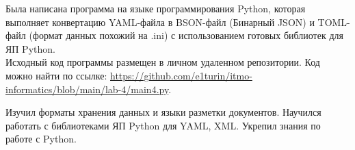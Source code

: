 \label{main4}
Была написана программа на языке программирования Python, которая выполняет конвертацию YAML-файла в BSON-файл (Бинарный JSON) и TOML-файл (формат данных похожий на .ini) с использованием готовых библиотек для ЯП Python.\\

Исходный код программы размещен в личном удаленном репозитории. Код можно найти по ссылке: \url{https://github.com/e1turin/itmo-informatics/blob/main/lab-4/main4.py}.\\ 



Изучил форматы хранения данных и языки разметки документов. Научился работать с библиотеками ЯП Python для YAML, XML. Укрепил знания по работе с Python.\\
\newpage






